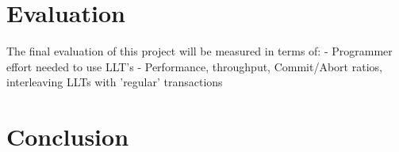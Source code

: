\documentclass{llncs}
\begin{document}
\section{Evaluation}

The final evaluation of this project will be measured in terms of:
- Programmer effort needed to use LLT's
- Performance, throughput, Commit/Abort ratios, interleaving LLTs with
'regular' transactions

\section{Conclusion}



\end{document}
